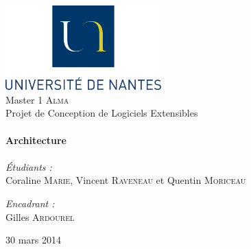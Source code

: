 
\begin{titlepage}
\begin{center}

\includegraphics[width=0.45\textwidth]{../figures/logoUN.png}~\\[2cm]

\LARGE{Master 1 \textsc{Alma}}\\[1.5cm]

\Large{Projet de Conception de Logiciels Extensibles}\\[0.5cm]

\HRule \\[0.4cm]
{ \huge \bfseries Architecture \\[0.4cm] }
\HRule \\[1.5cm]

\normalsize	
\emph{\'Etudiants :}\\
Coraline \textsc{Marie}, Vincent \textsc{Raveneau} et Quentin \textsc{Moriceau}

\vspace{0.5cm}

\emph{Encadrant :} \\
Gilles \textsc{Ardourel}

\vfill

{\large 30 mars 2014}

\end{center}
\end{titlepage}
